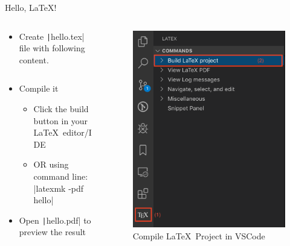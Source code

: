 \documentclass[xcolor={dvipsnames},aspectratio=169,10pt]{beamer}
\begin{document}
\begin{frame}[fragile]{Hello, \LaTeX!}

  \begin{columns}
    \begin{column}{.7\linewidth}
      \begin{itemize}
        \item Create \texttt|hello.tex| file with following content.
              \inputminted{latex}{./minted/hello.tex}
        \item Compile it
              \begin{itemize}
                \item Click the build button in your \LaTeX~editor/IDE
                \item OR using command line: \bashinline|latexmk -pdf hello|
              \end{itemize}
        \item Open \texttt|hello.pdf| to preview the result
      \end{itemize}
    \end{column}
  
  \begin{column}{.3\linewidth}
      \begin{figure}
        \centering
        \includegraphics[width=\linewidth]{./figs/vscode-compile-project.png}
        \caption{Compile \LaTeX~Project in VSCode}
      \end{figure}
    \end{column}
  \end{columns}
\end{frame}
\end{document}
